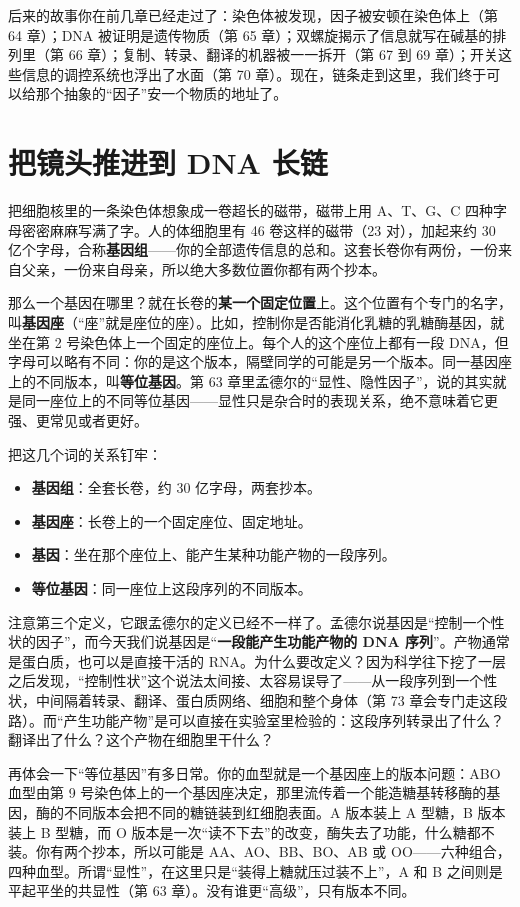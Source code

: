 后来的故事你在前几章已经走过了：染色体被发现，因子被安顿在染色体上（第 64 章）；DNA 被证明是遗传物质（第 65 章）；双螺旋揭示了信息就写在碱基的排列里（第 66 章）；复制、转录、翻译的机器被一一拆开（第 67 到 69 章）；开关这些信息的调控系统也浮出了水面（第 70 章）。现在，链条走到这里，我们终于可以给那个抽象的“因子”安一个物质的地址了。

\section{把镜头推进到 DNA 长链}

把细胞核里的一条染色体想象成一卷超长的磁带，磁带上用 A、T、G、C 四种字母密密麻麻写满了字。人的体细胞里有 46 卷这样的磁带（23 对），加起来约 30 亿个字母，合称\textbf{基因组}——你的全部遗传信息的总和。这套长卷你有两份，一份来自父亲，一份来自母亲，所以绝大多数位置你都有两个抄本。

那么一个基因在哪里？就在长卷的\textbf{某一个固定位置}上。这个位置有个专门的名字，叫\textbf{基因座}（“座”就是座位的座）。比如，控制你是否能消化乳糖的乳糖酶基因，就坐在第 2 号染色体上一个固定的座位上。每个人的这个座位上都有一段 DNA，但字母可以略有不同：你的是这个版本，隔壁同学的可能是另一个版本。同一基因座上的不同版本，叫\textbf{等位基因}。第 63 章里孟德尔的“显性、隐性因子”，说的其实就是同一座位上的不同等位基因——显性只是杂合时的表现关系，绝不意味着它更强、更常见或者更好。

把这几个词的关系钉牢：

\begin{itemize}[itemsep=2pt]
\item \textbf{基因组}：全套长卷，约 30 亿字母，两套抄本。
\item \textbf{基因座}：长卷上的一个固定座位、固定地址。
\item \textbf{基因}：坐在那个座位上、能产生某种功能产物的一段序列。
\item \textbf{等位基因}：同一座位上这段序列的不同版本。
\end{itemize}

注意第三个定义，它跟孟德尔的定义已经不一样了。孟德尔说基因是“控制一个性状的因子”，而今天我们说基因是“\textbf{一段能产生功能产物的 DNA 序列}”。产物通常是蛋白质，也可以是直接干活的 RNA。为什么要改定义？因为科学往下挖了一层之后发现，“控制性状”这个说法太间接、太容易误导了——从一段序列到一个性状，中间隔着转录、翻译、蛋白质网络、细胞和整个身体（第 73 章会专门走这段路）。而“产生功能产物”是可以直接在实验室里检验的：这段序列转录出了什么？翻译出了什么？这个产物在细胞里干什么？

再体会一下“等位基因”有多日常。你的血型就是一个基因座上的版本问题：ABO 血型由第 9 号染色体上的一个基因座决定，那里流传着一个能造糖基转移酶的基因，酶的不同版本会把不同的糖链装到红细胞表面。A 版本装上 A 型糖，B 版本装上 B 型糖，而 O 版本是一次“读不下去”的改变，酶失去了功能，什么糖都不装。你有两个抄本，所以可能是 AA、AO、BB、BO、AB 或 OO——六种组合，四种血型。所谓“显性”，在这里只是“装得上糖就压过装不上”，A 和 B 之间则是平起平坐的共显性（第 63 章）。没有谁更“高级”，只有版本不同。

